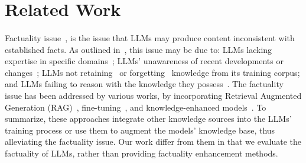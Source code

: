 \vspace{-2mm}
\section{Related Work}
\vspace{-2mm}
\paragraph{}
Factuality issue~\cite{wang2023survey, zhang2023siren}, is the issue that LLMs may produce content inconsistent with established facts. As outlined in~\cite{wang2023survey}, this issue may be due to:  LLMs lacking expertise in specific domains~\cite{ScienceQA,bolton2024biomedlm};  LLMs' unawareness of recent developments or changes~\cite{TempQuestions,yao2023editing};  LLMs not retaining~\cite{wang2023evaluating,TQ,NaturalQuestions} or forgetting~\cite{goodfellow2015empirical,kotha2023understanding,wang2022preserving, chen2020recall, zhai2023investigating} knowledge from its training corpus; and  LLMs failing to reason with the knowledge they possess~\cite{liu2023we, berglund2023reversal,tan2023chatgpt}. The factuality issue has been addressed by various works, by incorporating Retrieval Augmented Generation (RAG)~\cite{lewis2020retrieval, wang2024blendfilter}, fine-tuning~\cite{tian2023finetuning}, and knowledge-enhanced models~\cite{feng-etal-2023-factkb,diao2023mixtureofdomainadapters}. 
To summarize, these approaches integrate other knowledge sources into the LLMs' training process or use them to augment the models' knowledge base, thus alleviating the factuality issue. Our work differ from them in that we evaluate the factuality of LLMs, rather than providing factuality enhancement methods.


